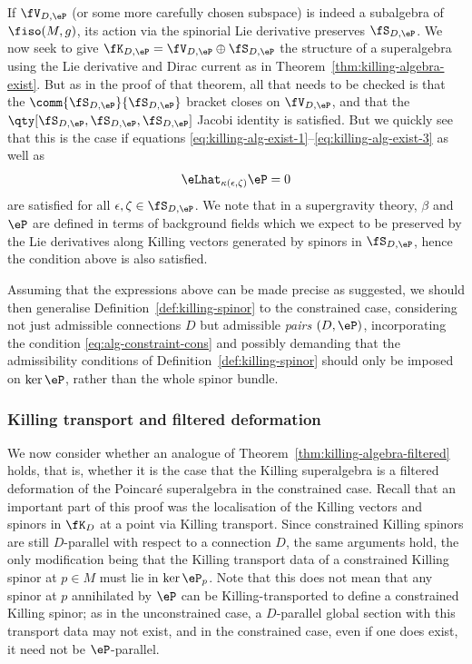 If $\fV_{D,\eP}$ (or some more carefully chosen subspace) is indeed a subalgebra of $\fiso(M,g)$, its action via the spinorial Lie derivative preserves $\fS_{D,\eP}$.
We now seek to give $\fK_{D,\eP} = \fV_{D,\eP}\oplus\fS_{D,\eP}$ the structure of a superalgebra using the Lie derivative and Dirac current as in Theorem~\ref{thm:killing-algebra-exist}. But as in the proof of that theorem, all that needs to be checked is that the $\comm{\fS_{D,\eP}}{\fS_{D,\eP}}$ bracket closes on $\fV_{D,\eP}$, and that the $\qty[\fS_{D,\eP},\fS_{D,\eP},\fS_{D,\eP}]$ Jacobi identity is satisfied. But we quickly see that this is the case if equations \eqref{eq:killing-alg-exist-1}--\eqref{eq:killing-alg-exist-3} as well as
\begin{equation}\label{eq:alg-constraint-cons}
	\eLhat_{\kappa(\epsilon,\zeta)}\eP = 0
\end{equation}
are satisfied for all $\epsilon,\zeta\in\fS_{D,\eP}$. We note that in a supergravity theory, $\beta$ and $\eP$ are defined in terms of background fields which we expect to be preserved by the Lie derivatives along Killing vectors generated by spinors in $\fS_{D,\eP}$, hence the condition above is also satisfied.

Assuming that the expressions above can be made precise as suggested, we should then generalise Definition~\ref{def:killing-spinor} to the constrained case, considering not just admissible connections $D$ but admissible \emph{pairs} $(D,\eP)$, incorporating the condition \eqref{eq:alg-constraint-cons} and possibly demanding that the admissibility conditions of Definition~\ref{def:killing-spinor} should only be imposed on $\ker\eP$, rather than the whole spinor bundle.

\subsubsection{Killing transport and filtered deformation}

We now consider whether an analogue of Theorem~\ref{thm:killing-algebra-filtered} holds, that is, whether it is the case that the Killing superalgebra is a filtered deformation of the Poincar\'e superalgebra in the constrained case. Recall that an important part of this proof was the localisation of the Killing vectors and spinors in $\fK_D$ at a point via Killing transport. Since constrained Killing spinors are still $D$-parallel with respect to a connection $D$, the same arguments hold, the only modification being that the Killing transport data of a constrained Killing spinor at $p\in M$ must lie in $\ker\eP_p$. Note that this does not mean that any spinor at $p$ annihilated by $\eP$ can be Killing-transported to define a constrained Killing spinor; as in the unconstrained case, a $D$-parallel global section with this transport data may not exist, and in the constrained case, even if one does exist, it need not be $\eP$-parallel.

